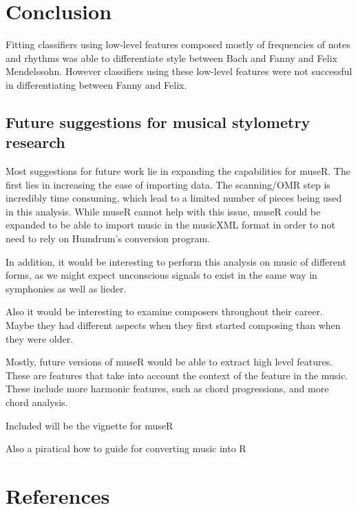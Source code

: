 \documentclass[12pt,twoside]{reedthesis}
\theoremstyle{definition}
\theoremstyle{definition}
\theoremstyle{definition}
\theoremstyle{remark}
\begin{document}
\chapter*{Conclusion}\label{conclusion}

Fitting classifiers using low-level features composed mostly of
frequencies of notes and rhythms was able to differentiate style between
Bach and Fanny and Felix Mendelssohn. However classifiers using these
low-level features were not successful in differentiating between Fanny
and Felix.

\section{Future suggestions for musical stylometry
research}\label{future-suggestions-for-musical-stylometry-research}

Most suggestions for future work lie in expanding the capabilities for
museR. The first lies in increasing the ease of importing data. The
scanning/OMR step is incredibly time consuming, which lead to a limited
number of pieces being used in this analysis. While museR cannot help
with this issue, museR could be expanded to be able to import music in
the musicXML format in order to not need to rely on Humdrum's conversion
program.

In addition, it would be interesting to perform this analysis on music
of different forms, as we might expect unconscious signals to exist in
the same way in symphonies as well as lieder.

Also it would be interesting to examine composers throughout their
career. Maybe they had different aspects when they first started
composing than when they were older.

Mostly, future versions of museR would be able to extract high level
features. These are features that take into account the context of the
feature in the music. These include more harmonic features, such as
chord progressions, and more chord analysis.

\appendix

Included will be the vignette for museR

Also a piratical how to guide for converting music into R

\backmatter

\chapter*{References}\label{references}
\end{document}
